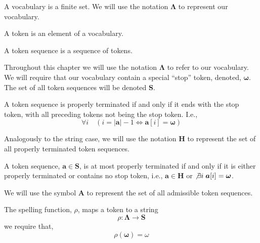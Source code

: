 \begin{definition}[Vocabulary]
    A vocabulary is a finite set.
    We will use the notation $\mathbf{\Lambda}$ to represent our vocabulary.
\end{definition}

\begin{definition}[Token]
    A token is an element of a vocabulary.
\end{definition}

\begin{definition}
    A token sequence is a sequence of tokens.
\end{definition}

Throughout this chapter we will use the notation $\boldsymbol{\Lambda}$ to refer to our vocabulary. We will require that
our vocabulary contain a special ``stop'' token, denoted, $\boldsymbol{\omega}$.
The set of all token sequences will be denoted $\boldsymbol{S}$.


\begin{definition}
    A token sequence is properly terminated if and only if it ends with the stop token, with all
    preceding tokens not being the stop token. I.e.,
    \[
    \forall i \quad (i = |\boldsymbol{a}| - 1 \iff \boldsymbol{a}[i] = \boldsymbol{\omega})
    \]
\end{definition}

Analogously to the string case, we will use the notation $\boldsymbol{H}$ to
represent the set of all properly terminated token sequences.

\begin{definition}
    A token sequence, $\boldsymbol{a} \in \boldsymbol{S}$, is at most properly terminated if and only if it is either properly
    terminated or contains no stop token, i.e.,
    $\boldsymbol{a} \in \boldsymbol{H}$ or $\not\exists i \;
    \boldsymbol{a}[i] = \boldsymbol{\omega}$.
\end{definition}

We will use the symbol $\mathbf{A}$ to represent the set of all admissible token sequences.

\begin{definition}
    The spelling function, $\rho$, maps a token to a string
    $$
    \rho: \boldsymbol{\Lambda} \to \boldsymbol{S}
    $$
    we require that,
    $$
    \rho(\boldsymbol{\omega}) = \omega
    $$
\end{definition}

